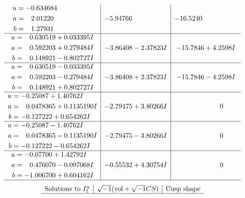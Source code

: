 \documentclass[1p]{elsarticle_modified}
\theoremstyle{definition}
\newcommand{\I}{\sqrt{-1}}
\begin{document}
$$\begin{array}{c|c|c}
\begin{aligned}
u &= -0.634684\phantom{ +0.000000I} \\
a &= \phantom{-}2.01220\phantom{ +0.000000I} \\
b &= \phantom{-}1.27931\phantom{ +0.000000I}\end{aligned}
 & -5.94766\phantom{ +0.000000I} & -16.5240\phantom{ +0.000000I} \\ \hline\begin{aligned}
u &= \phantom{-}0.630519 + 0.033395 I \\
a &= \phantom{-}0.592203 + 0.279484 I \\
b &= \phantom{-}0.148921 - 0.802727 I\end{aligned}
 & -3.86408 - 2.37823 I & -15.7846 + 4.2598 I \\ \hline\begin{aligned}
u &= \phantom{-}0.630519 - 0.033395 I \\
a &= \phantom{-}0.592203 - 0.279484 I \\
b &= \phantom{-}0.148921 + 0.802727 I\end{aligned}
 & -3.86408 + 2.37823 I & -15.7846 - 4.2598 I \\ \hline\begin{aligned}
u &= -0.25087 + 1.40762 I \\
a &= \phantom{-}0.0478365 + 0.1135190 I \\
b &= -0.127222 + 0.654262 I\end{aligned}
 & -2.79475 + 3.80266 I & \phantom{-0.000000 } 0 \\ \hline\begin{aligned}
u &= -0.25087 - 1.40762 I \\
a &= \phantom{-}0.0478365 - 0.1135190 I \\
b &= -0.127222 - 0.654262 I\end{aligned}
 & -2.79475 - 3.80266 I & \phantom{-0.000000 } 0 \\ \hline\begin{aligned}
u &= -0.07700 + 1.42792 I \\
a &= \phantom{-}0.476070 - 0.097068 I \\
b &= -1.006700 + 0.604162 I\end{aligned}
 & -0.55532 + 4.30754 I & \phantom{-0.000000 } 0\\
 \hline 
 \end{array}$$\newpage$$\begin{array}{c|c|c}  
\text{Solutions to }I^u_{1}& \I (\text{vol} + \sqrt{-1}CS) & \text{Cusp shape}\\
 \hline 

\end{array}$$
\end{document}
